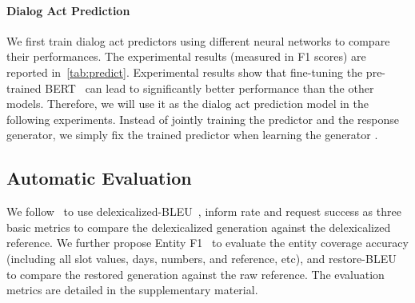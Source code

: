 \documentclass[11pt,a4paper]{article}
\begin{document}
\paragraph{Dialog Act Prediction}
We first train dialog act predictors using different neural networks to compare their performances. The experimental results (measured in F1 scores) are reported in~\autoref{tab:predict}. Experimental results show that fine-tuning the pre-trained BERT~\cite{devlin2018bert} can lead to significantly better performance than the other models. Therefore, we will use it as the dialog act prediction model in the following experiments. Instead of jointly training the predictor and the response generator, we simply fix the trained predictor when learning the generator .


\subsection{Automatic Evaluation}
We follow~\citet{DBLP:conf/emnlp/BudzianowskiWTC18} to use delexicalized-BLEU~\cite{papineni2002bleu}, inform rate and request success as three basic metrics to compare the delexicalized generation against the delexicalized reference. We further propose Entity F1~\cite{DBLP:conf/eacl/Rojas-BarahonaG17} to evaluate the entity coverage accuracy (including all slot values, days, numbers, and reference, etc), and restore-BLEU to compare the restored generation against the raw reference. 
The evaluation metrics are detailed in the supplementary material.
\end{document}
